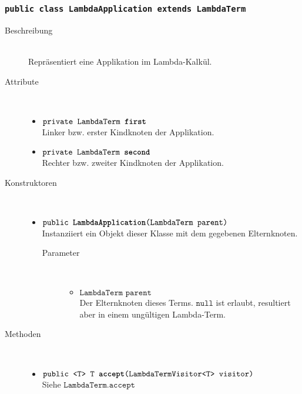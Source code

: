 \subsubsection{\normalfont \texttt{public class \textbf{LambdaApplication} extends LambdaTerm}}

\begin{description}
\item[Beschreibung] \hfill \\ Repräsentiert eine Applikation im Lambda-Kalkül.
\item[Attribute] \hfill \\
	\vspace{-.8cm}
	\begin{itemize}
		\item $\texttt{private LambdaTerm \textbf{first}}$ \\ Linker bzw. erster Kindknoten der Applikation.
		\item $\texttt{private LambdaTerm \textbf{second}}$ \\ Rechter bzw. zweiter Kindknoten der Applikation.
	\end{itemize}
	
\item[Konstruktoren] \hfill \\
	\vspace{-.8cm}
	\begin{itemize}
		\item $\texttt{public \textbf{LambdaApplication}(LambdaTerm parent)}$ \\ Instanziiert ein Objekt dieser Klasse mit dem gegebenen Elternknoten.
		\begin{description}
			\item[Parameter] \hfill \\
			\vspace{-.8cm}
			\begin{itemize}
				\item $\texttt{LambdaTerm parent}$ \\ Der Elternknoten dieses Terms. $\texttt{null}$ ist erlaubt, resultiert aber in einem ungültigen Lambda-Term.
			\end{itemize}
		\end{description}
	\end{itemize}
	
\item[Methoden] \hfill \\
	\vspace{-.8cm}
	\begin{itemize}
		\item $\texttt{public <T> T \textbf{accept}(LambdaTermVisitor<T> visitor)}$ \\ Siehe $\texttt{LambdaTerm.accept}$
		

\end{itemize}
\end{description}
